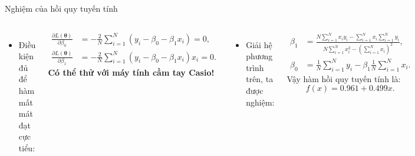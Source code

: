 \begin{frame}{Nghiệm của hồi quy tuyến tính}

\begin{columns}
    \begin{itemize}
        \item Điều kiện đủ để hàm mất mát đạt cực tiểu:
    \end{itemize}
    \begin{align}
        \frac{\partial L(\boldsymbol{\theta})}{\partial \beta_0} &= -\frac{2}{N} \sum_{i=1}^{N} (y_i - \beta_0 - \beta_1 x_i) = 0, \\
        \frac{\partial L(\boldsymbol{\theta})}{\partial \beta_1} &= -\frac{2}{N} \sum_{i=1}^{N} (y_i - \beta_0 - \beta_1 x_i) x_i = 0.
    \end{align}
    \textbf{Có thể thử với máy tính cầm tay Casio!}
    \begin{itemize}
        \item Giải hệ phương trình trên, ta được nghiệm:
    \end{itemize}
    \begin{align}
        \beta_1 &= \frac{N \sum_{i=1}^{N} x_i y_i - \sum_{i=1}^{N} x_i \sum_{i=1}^{N} y_i}{N \sum_{i=1}^{N} x_i^2 - (\sum_{i=1}^{N} x_i)^2}, \\
        \beta_0 &= \frac{1}{N} \sum_{i=1}^{N} y_i - \beta_1 \frac{1}{N} \sum_{i=1}^{N} x_i.
    \end{align}
    Vậy hàm hồi quy tuyến tính là:
    \[
    f(x) = 0.961 + 0.499x.
    \]
\end{columns}
\end{frame}

